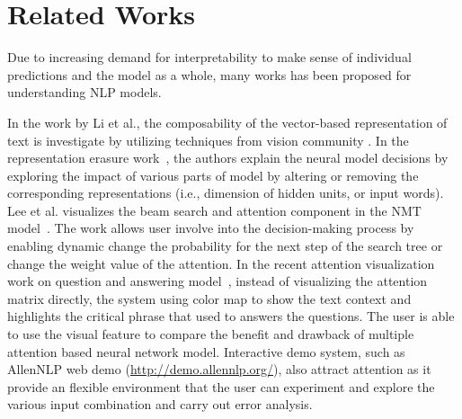 \section{Related Works}
Due to increasing demand for interpretability to make sense of individual predictions and the model as a whole, many works has been proposed for understanding NLP models. 

In the work by Li et al., the composability of the vector-based representation of text is investigate by utilizing techniques from vision community \cite{LiChenHovy2015}. 
%
In the representation erasure work~\cite{li2016understanding}, the authors explain the neural model decisions by exploring the impact of various parts of model by altering or removing the corresponding representations (i.e., dimension of hidden units, or input words). 
Lee et al. visualizes the beam search and attention component in the NMT model~\cite{lee2017interactive}. The work allows user involve into the decision-making process by enabling dynamic change the probability for the next step of the search tree or change the weight value of the attention.
In the recent attention visualization work on question and answering model~\cite{ruckle2017end}, 
instead of visualizing the attention matrix directly, the system using color map to show the text context and highlights the critical phrase that used to answers the questions. The user is able to use the visual feature to compare the benefit and drawback of multiple attention based neural network model.
Interactive demo system, such as AllenNLP web demo (\url{http://demo.allennlp.org/}), also attract attention as it provide an flexible environment that the user can experiment and explore the various input combination and carry out error analysis.

